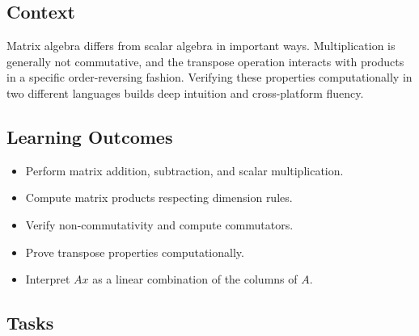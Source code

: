 \documentclass[a4paper,11pt]{article}
\begin{document}
\subsection{Context}

Matrix algebra differs from scalar algebra in important ways. Multiplication is generally not commutative, and the transpose operation interacts with products in a specific order-reversing fashion. Verifying these properties computationally in two different languages builds deep intuition and cross-platform fluency.

\subsection{Learning Outcomes}

\begin{itemize}[leftmargin=*]
  \item Perform matrix addition, subtraction, and scalar multiplication.
  \item Compute matrix products respecting dimension rules.
  \item Verify non-commutativity and compute commutators.
  \item Prove transpose properties computationally.
  \item Interpret $Ax$ as a linear combination of the columns of $A$.
\end{itemize}

\subsection{Tasks}
\end{document}

